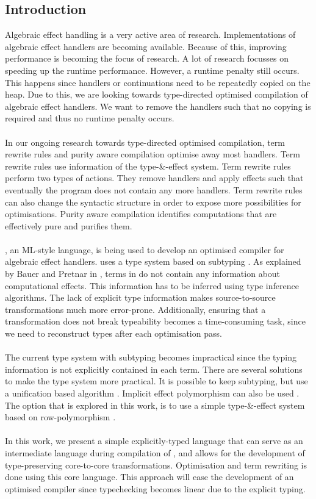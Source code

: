 \documentclass[a0,portrait]{a0poster}
\begin{document}
\begin{multicols}{2}
\section*{Introduction}
Algebraic effect handling is a very active area of research. Implementations of algebraic effect handlers are becoming available. Because of this, improving performance is becoming the focus of research. A lot of research focusses on speeding up the runtime performance. However, a runtime penalty still occurs. This happens since handlers or continuations need to be repeatedly copied on the heap. Due to this, we are looking towards type-directed optimised compilation of algebraic effect handlers. We want to remove the handlers such that no copying is required and thus no runtime penalty occurs. \\
\\
In our ongoing research towards type-directed optimised compilation, term rewrite rules and purity aware compilation optimise away most handlers. Term rewrite rules use information of the type-\&-effect system. Term rewrite rules perform two types of actions. They remove handlers and apply effects such that eventually the program does not contain any more handlers. Term rewrite rules can also change the syntactic structure in order to expose more possibilities for optimisations. Purity aware compilation identifies computations that are effectively pure and purifies them.  \\
\\
\eff, an ML-style language, is being used to develop an optimised compiler for algebraic effect handlers. \eff uses a type system based on subtyping \cite{effectsystem}. As explained by Bauer and Pretnar in \cite{programming}, terms in \eff do not contain any information about computational effects. This information has to be inferred using type inference algorithms. The lack of explicit type information makes source-to-source transformations much more error-prone. Additionally, ensuring that a transformation does not break typeability becomes a time-consuming task, since we need to reconstruct types after each optimisation pass. \\
\\
The current type system with subtyping becomes impractical since the typing information is not explicitly contained in each term. There are several solutions to make the type system more practical. It is possible to keep subtyping, but use a unification based algorithm \cite{mlsub}. Implicit effect polymorphism can also be used \cite{impliciteff}. The option that is explored in this work, is to use a simple type-\&-effect system based on row-polymorphism \cite{type-directed, leijen2014koka, row}. \\
\\
In this work, we present a simple explicitly-typed language that can serve as an intermediate language during compilation of \eff, and allows for the development of type-preserving core-to-core transformations. Optimisation and term rewriting is done using this core language. This approach will ease the development of an optimised compiler since typechecking becomes linear due to the explicit typing.


\end{multicols}
\end{document}
